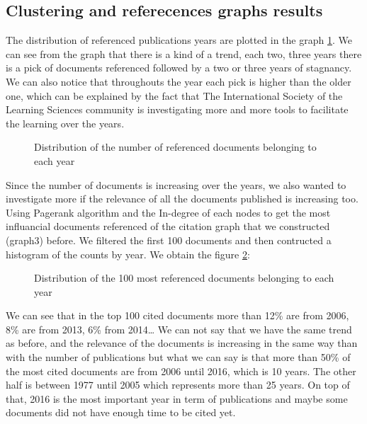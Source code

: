 \documentclass[article,twocolumn]{IEEEtran}
\begin{document}
    \hypertarget{clustering-and-referecences-graphs-results}{%
\subsection{Clustering and referecences graphs
results}\label{clustering-and-referecences-graphs-results}}

The distribution of referenced publications years are plotted in the
graph \ref{count_ref_docs}. We can see from the graph that there is a
kind of a trend, each two, three years there is a pick of documents
referenced followed by a two or three years of stagnancy. We can also
notice that throughouts the year each pick is higher than the older one,
which can be explained by the fact that The International Society of the
Learning Sciences community is investigating more and more tools to
facilitate the learning over the years.


    \begin{figure}
        \begin{center}\end{center}
        \caption{Distribution of the number of referenced documents belonging to each year}
        \label{count_ref_docs}
    \end{figure}
    
    Since the number of documents is increasing over the years, we also
wanted to investigate more if the relevance of all the documents
published is increasing too. Using Pagerank algorithm and the In-degree
of each nodes to get the most influancial documents referenced of the
citation graph that we constructed (graph3) before. We filtered the
first 100 documents and then contructed a histogram of the counts by
year. We obtain the figure \ref{fig7}:


    \begin{figure}
        \begin{center}\end{center}
        \caption{Distribution of the 100 most referenced documents belonging to each year}
        \label{fig7}
    \end{figure}
    
    We can see that in the top 100 cited documents more than 12\% are from
2006, 8\% are from 2013, 6\% from 2014\ldots{} We can not say that we
have the same trend as before, and the relevance of the documents is
increasing in the same way than with the number of publications but what
we can say is that more than 50\% of the most cited documents are from
2006 until 2016, which is 10 years. The other half is between 1977 until
2005 which represents more than 25 years. On top of that, 2016 is the
most important year in term of publications and maybe some documents did
not have enough time to be cited yet.
\end{document}
